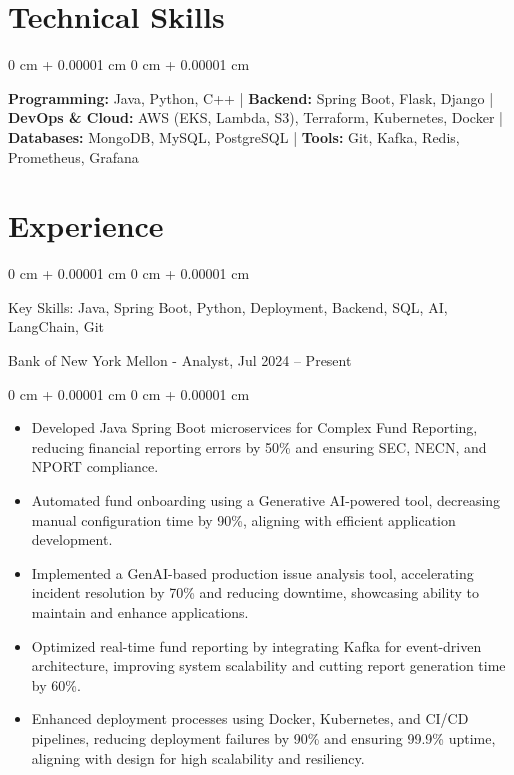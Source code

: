 \documentclass[10pt, letterpaper]{article}
\newenvironment{highlights}{
    \begin{itemize}[
        topsep=0.10 cm,
        parsep=0.10 cm,
        partopsep=0pt,
        itemsep=0pt,
        leftmargin=0 cm + 10pt
    ]
}{
    \end{itemize}
} %
\newenvironment{onecolentry}{
    \begin{adjustwidth}{
        0 cm + 0.00001 cm
    }{
        0 cm + 0.00001 cm
    }
}{
    \end{adjustwidth}
} %
\newenvironment{twocolentry}[2][]{
    \onecolentry
    \def\secondColumn{#2}
    \setcolumnwidth{\fill, 4.5 cm}
    \begin{paracol}{2}
}{
    \switchcolumn \raggedleft \secondColumn
    \end{paracol}
    \endonecolentry
} %
\begin{document}
    \section{Technical Skills}

        \begin{onecolentry}
            \textbf{Programming:} Java, Python, C++ | \textbf{Backend:} Spring Boot, Flask, Django | \textbf{DevOps \& Cloud:} AWS (EKS, Lambda, S3), Terraform, Kubernetes, Docker | \textbf{Databases:} MongoDB, MySQL, PostgreSQL | \textbf{Tools:} Git, Kafka, Redis, Prometheus, Grafana
        \end{onecolentry}

    \section{Experience}

        \begin{twocolentry}{
            Bank of New York Mellon - Analyst, Jul 2024 – Present
        }
            Key Skills: Java, Spring Boot, Python, Deployment, Backend, SQL, AI, LangChain, Git
        \end{twocolentry}

        \vspace{0.10 cm}
        \begin{onecolentry}
            \begin{highlights}
                \item Developed Java Spring Boot microservices for Complex Fund Reporting, reducing financial reporting errors by 50\% and ensuring SEC, NECN, and NPORT compliance.
                \item Automated fund onboarding using a Generative AI-powered tool, decreasing manual configuration time by 90\%, aligning with efficient application development.
                \item Implemented a GenAI-based production issue analysis tool, accelerating incident resolution by 70\% and reducing downtime, showcasing ability to maintain and enhance applications.
                \item Optimized real-time fund reporting by integrating Kafka for event-driven architecture, improving system scalability and cutting report generation time by 60\%.
                \item Enhanced deployment processes using Docker, Kubernetes, and CI/CD pipelines, reducing deployment failures by 90\% and ensuring 99.9\% uptime, aligning with design for high scalability and resiliency.
            \end{highlights}
        \end{onecolentry}
\end{document}
